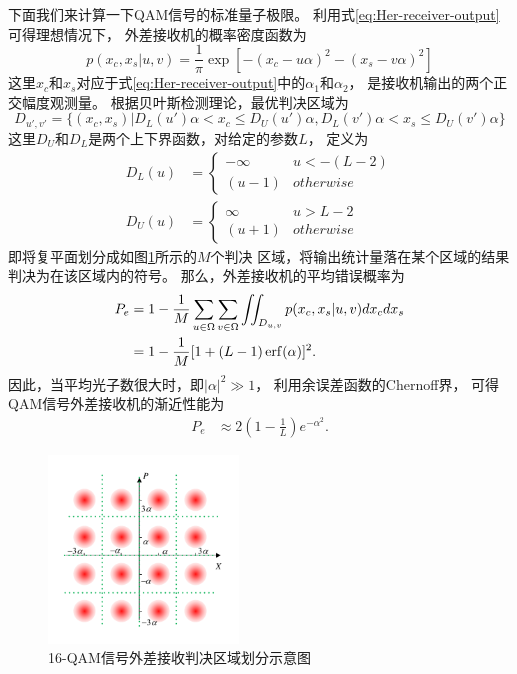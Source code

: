 下面我们来计算一下QAM信号的标准量子极限。
利用式\ref{eq:Her-receiver-output}可得理想情况下，
外差接收机的概率密度函数为\cite{kato1999quantum}
\begin{equation}
p(x_c, x_s| u, v) = \frac{1}{\pi} \exp[-(x_c - u\alpha)^2 - (x_s - v\alpha)^2]
\end{equation}
这里$x_c$和$x_s$对应于式\ref{eq:Her-receiver-output}中的$\alpha_1$和$\alpha_2$，
是接收机输出的两个正交幅度观测量。
根据贝叶斯检测理论，最优判决区域为
\begin{equation}
D_{u',v'} = \{ (x_c,x_s)| D_L(u')\alpha < x_c \le D_U(u')\alpha,  D_L(v')\alpha < x_s \le D_U(v')\alpha \}
\end{equation}
这里$D_U$和$D_L$是两个上下界函数，对给定的参数$L$，
定义为
\begin{equation}
\begin{split}
D_L(u) &= \begin{cases}    
          -\infty     & u < -(L-2)  \\
          (u-1) & otherwise
         \end{cases}\\
D_U(u) &= \begin{cases} 
          \infty     & u > L-2  \\
          (u+1) & otherwise
         \end{cases}
\label{eq:LU-fun}
\end{split}
\end{equation}
即将复平面划分成如图\ref{fig:QAM-domain-split}所示的$M$个判决
区域，将输出统计量落在某个区域的结果判决为在该区域内的符号。
那么，外差接收机的平均错误概率为
\begin{equation}
\begin{split}
P_e &= 1 - \frac{1}{M} \sum_{u\in\Omega}\sum_{v\in\Omega} \iint_{D_{u,v}} p(x_c,x_s|u,v) dx_c dx_s \\
    &= 1 - \frac{1}{M}[1+(L-1) \erf(\alpha)]^2.
\end{split}
\end{equation}
因此，当平均光子数很大时，即$|\alpha|^2 \gg 1$，
利用余误差函数的Chernoff界\cite{chang2011chernoff}，
可得QAM信号外差接收机的渐近性能为
\begin{equation}
\begin{split}
P_e &\approx 2(1 - \frac{1}{L}) e^{-\alpha^2}.
\label{eq:QAM-SQL-approx}
\end{split}
\end{equation}

\begin{figure}
\centering
  \includegraphics[height=5cm]{figures/chap3/QAM-domain-split}
  \caption{16-QAM信号外差接收判决区域划分示意图}
  \label{fig:QAM-domain-split}
\end{figure}

